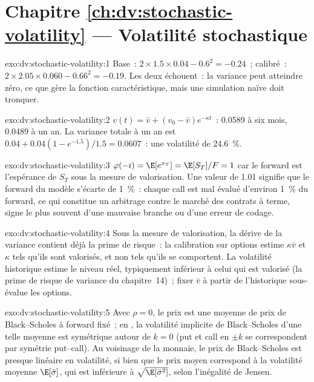 \section*{Chapitre \ref{ch:dv:stochastic-volatility} --- Volatilité stochastique}

\begin{solution}{exo:dv:stochastic-volatility:1}
Base~: $2\times1.5\times0.04-0.6^2=-0.24$~; calibré~: $2\times2.05\times0.060-0.66^2=-0.19$. Les deux échouent~: la
variance peut atteindre zéro, ce que gère la fonction caractéristique, mais une simulation naïve doit tronquer.
\end{solution}

\begin{solution}{exo:dv:stochastic-volatility:2}
$v(t)=\bar v+(v_0-\bar v)e^{-\kappa t}$~: 0.0589 à six mois, 0.0489 à un an. La variance totale à un an est
$0.04+0.04(1-e^{-1.5})/1.5=0.0607$~: une volatilité de 24.6~\%.
\end{solution}

\begin{solution}{exo:dv:stochastic-volatility:3}
$\varphi(-i)=\E[e^{x_T}]=\E[S_T]/F=1$ car le forward est l'espérance de $S_T$ sous la mesure de valorisation. Une
valeur de 1.01 signifie que le forward du modèle s'écarte de 1~\%~: chaque call est mal évalué d'environ 1~\% du forward, ce qui constitue un
arbitrage contre le marché des contrats à terme, signe le plus souvent d'une mauvaise branche ou d'une erreur de codage.
\end{solution}

\begin{solution}{exo:dv:stochastic-volatility:4}
Sous la mesure de valorisation, la dérive de la variance contient déjà la prime de risque~: la calibration sur options estime
$\kappa\bar v$ et $\kappa$ tels qu'ils sont valorisés, et non tels qu'ils se comportent. La volatilité historique
estime le niveau réel, typiquement inférieur à celui qui est valorisé (la prime de risque de variance du chapitre~14)~; fixer $\bar v$ à partir de
l'historique sous-évalue les options.
\end{solution}

\begin{solution}{exo:dv:stochastic-volatility:5}
Avec $\rho=0$, le prix est une moyenne de prix de Black--Scholes à forward fixé~; en , la
volatilité implicite de Black--Scholes d'une telle moyenne est symétrique autour de $k=0$ (put et call en $\pm k$ se correspondent par
symétrie put--call). Au voisinage de la monnaie, le prix de Black--Scholes est presque linéaire en volatilité, si bien que le prix moyen
correspond à la volatilité moyenne $\E[\bar\sigma]$, qui est inférieure à $\sqrt{\E[\bar\sigma^2]}$, selon
l'inégalité de Jensen.
\end{solution}

